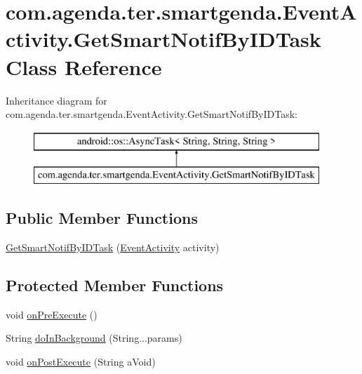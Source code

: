 \hypertarget{classcom_1_1agenda_1_1ter_1_1smartgenda_1_1_event_activity_1_1_get_smart_notif_by_i_d_task}{\section{com.\-agenda.\-ter.\-smartgenda.\-Event\-Activity.\-Get\-Smart\-Notif\-By\-I\-D\-Task Class Reference}
\label{classcom_1_1agenda_1_1ter_1_1smartgenda_1_1_event_activity_1_1_get_smart_notif_by_i_d_task}
}
Inheritance diagram for com.\-agenda.\-ter.\-smartgenda.\-Event\-Activity.\-Get\-Smart\-Notif\-By\-I\-D\-Task\-:\begin{figure}[H]
\begin{center}
\leavevmode
\includegraphics[height=2.000000cm]{classcom_1_1agenda_1_1ter_1_1smartgenda_1_1_event_activity_1_1_get_smart_notif_by_i_d_task}
\end{center}
\end{figure}
\subsection*{Public Member Functions}
\begin{DoxyCompactItemize}
\item 
\hyperlink{classcom_1_1agenda_1_1ter_1_1smartgenda_1_1_event_activity_1_1_get_smart_notif_by_i_d_task_a00a7c2e07fc532351f2baefdf2ca0c94}{Get\-Smart\-Notif\-By\-I\-D\-Task} (\hyperlink{classcom_1_1agenda_1_1ter_1_1smartgenda_1_1_event_activity}{Event\-Activity} activity)
\end{DoxyCompactItemize}
\subsection*{Protected Member Functions}
\begin{DoxyCompactItemize}
\item 
void \hyperlink{classcom_1_1agenda_1_1ter_1_1smartgenda_1_1_event_activity_1_1_get_smart_notif_by_i_d_task_a8dcc0a2fde7d66ab23f6e233cfed67eb}{on\-Pre\-Execute} ()
\item 
String \hyperlink{classcom_1_1agenda_1_1ter_1_1smartgenda_1_1_event_activity_1_1_get_smart_notif_by_i_d_task_ac37a3d995e9a893be402be1586f4a7a3}{do\-In\-Background} (String...\-params)
\item 
void \hyperlink{classcom_1_1agenda_1_1ter_1_1smartgenda_1_1_event_activity_1_1_get_smart_notif_by_i_d_task_a81c65eff517465b2329f8d933cfcffd8}{on\-Post\-Execute} (String a\-Void)
\end{DoxyCompactItemize}


